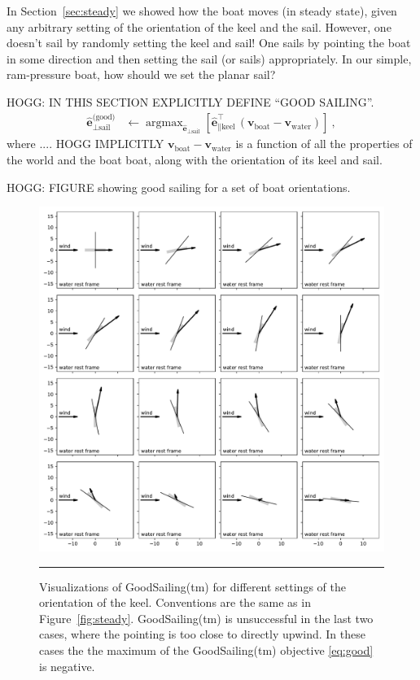 \documentclass[letterpaper]{article}
\DeclareMathOperator*{\argmax}{argmax}
\renewcommand{\vec}[1]{\boldsymbol{#1}}
\newcommand{\uvec}{\vec{\hat{e}}}
\newcommand{\water}{\text{water}}
\newcommand{\boat}{\text{boat}}
\newcommand{\good}{\text{(good)}}
\newcommand{\sail}{\text{sail}}
\newcommand{\keel}{\text{keel}}
\newcommand{\vwater}{\vec{v}_\water}
\newcommand{\vboat}{\vec{v}_\boat}
\newcommand{\secref}[1]{Section~\ref{#1}}
\newcommand{\figref}[1]{Figure~\ref{#1}}
\newcommand{\figurerule}{\rule[1ex]{\textwidth}{0.2pt}}
\begin{document}
In \secref{sec:steady} we showed how the boat moves (in steady state), given any arbitrary setting of the orientation of the keel and the sail.
However, one doesn't sail by randomly setting the keel and sail!
One sails by pointing the boat in some direction and then setting the sail (or sails) appropriately.
In our simple, ram-pressure boat, how should we set the planar sail?

HOGG: IN THIS SECTION EXPLICITLY DEFINE ``GOOD SAILING''.
\begin{align}\label{eq:good}
    \uvec_{\perp\sail}^\good &\leftarrow \argmax_{\uvec_{\perp\sail}} \left[\uvec_{\parallel\keel}^\top\,(\vboat-\vwater)\right] ~,
\end{align}
where .... HOGG IMPLICITLY $\vboat-\vwater$ is a function of all the properties of the world and the boat boat, along with the orientation of its keel and sail.

HOGG: FIGURE showing good sailing for a set of boat orientations.
\begin{figure}[t!]
  \includegraphics[width=\textwidth]{good.pdf}
  \caption{Visualizations of GoodSailing(tm) for different settings of the orientation of the keel.
  Conventions are the same as in \figref{fig:steady}.
  GoodSailing(tm) is unsuccessful in the last two cases, where the pointing is too close to directly upwind.
  In these cases the the maximum of the GoodSailing(tm) objective \eqref{eq:good} is negative.\label{fig:good}}
  \figurerule
\end{figure}
\end{document}
